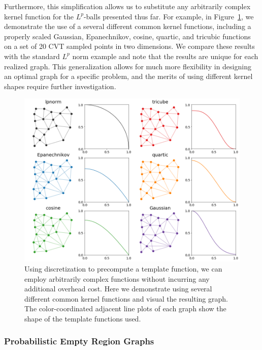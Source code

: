 Furthermore, this simplification allows us to substitute any arbitrarily complex kernel function for the $L^p$-balls presented thus far.
%
For example, in Figure~\ref{fig:discrete_beta}, we demonstrate the use of a several different common kernel functions, including a properly scaled Gaussian, Epanechnikov, cosine, quartic, and tricubic functions on a set of 20 CVT sampled points in two dimensions.
%
We compare these results with the standard $L^p$ norm example and note that the results are unique for each realized graph.
%
This generalization allows for much more flexibility in designing an optimal graph for a specific problem, and the merits of using different kernel shapes require further investigation.

\begin{figure}[t]
    \includegraphics[width=\linewidth]{figs/chap7/beta_shapes.png}
    \caption[Empty region graphs derived using kernel functions]{Using discretization to precompute a template function, we can employ arbitrarily complex functions without incurring any additional overhead cost.
    Here we demonstrate using several different common kernel functions and visual the resulting graph.
    The color-coordinated adjacent line plots of each graph show the shape of the template functions used.}
    \label{fig:discrete_beta}
\end{figure}

\subsubsection{Probabilistic Empty Region Graphs}

